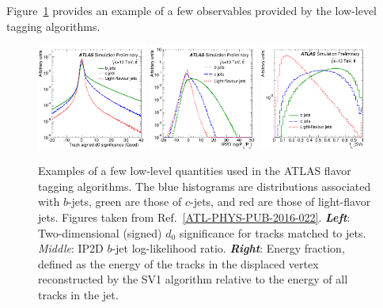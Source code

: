 Figure~\ref{fig:ftag_low_level_var} provides an example of a few observables provided by the low-level tagging algorithms.

\begin{figure}[!htb]
    \begin{center}
        \includegraphics[width=0.32\textwidth]{figures/chapter3/ftag/ftag_track_d0_sig_ip2d}
        \includegraphics[width=0.32\textwidth]{figures/chapter3/ftag/ftag_ip2d_pb}
        \includegraphics[width=0.32\textwidth]{figures/chapter3/ftag/ftag_sv1_fE}
        \caption{
            Examples of a few low-level quantities used in the ATLAS flavor tagging algorithms.
            The blue histograms are distributions associated with $b$-jets, green are those of $c$-jets, and red
            are those of light-flavor jets.
            Figures taken from Ref.~\ref{ATL-PHYS-PUB-2016-022}.
            \textbf{\textit{Left}}: Two-dimensional (signed) $d_0$ significance for tracks matched to jets.
            \textit{Middle}: IP2D $b$-jet log-likelihood ratio.
            \textbf{\textit{Right}}: Energy fraction, defined as the energy of the tracks in the displaced
                vertex reconstructed by the SV1 algorithm relative to the energy of all tracks in the jet.
        }
        \label{fig:ftag_low_level_var}
    \end{center}
\end{figure}

